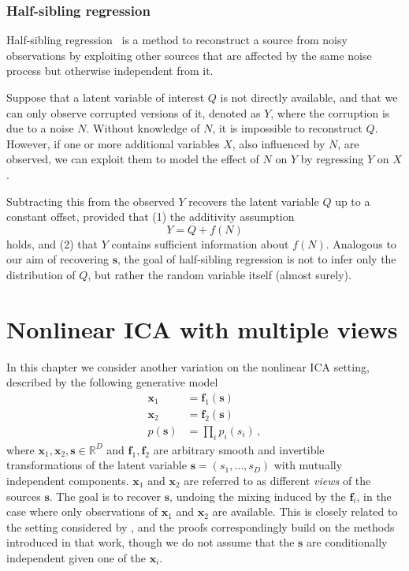 \subsubsection{Half-sibling regression}
\label{sec:hsr}
Half-sibling regression~\citep{scholkopf2016modeling} is a method to reconstruct a source from noisy observations by exploiting other sources that are affected by the same noise process but otherwise independent from it.

Suppose that a latent variable of interest $Q$ is not directly available, and that we can only observe corrupted versions of it, denoted as  $Y$, where the corruption is due to a noise $N$.
Without knowledge of $N$, it is impossible to reconstruct $Q$. However, if one or more additional variables $X$, also influenced by $N$, are observed, we can exploit them to model the effect of $N$ on $Y$ by regressing $Y$ on $X$.

Subtracting this from the observed $Y$ recovers the latent variable $Q$ up to a constant offset,
provided that (1) the additivity assumption
\[
Y = Q + f(N)
\]
holds, and (2) that $Y$ contains sufficient information about $f(N)$.
Analogous to our aim of recovering $\bm{s}$,
the goal of half-sibling regression is not to infer only the distribution of $Q$, but rather the random variable itself (almost surely).

\section{Nonlinear ICA with multiple views}\label{sec:ica-nonlinear-ica-with-mulitple-views}

In this chapter we consider another variation on the nonlinear ICA setting, described by the following generative model    
\begin{align}
\bm{x}_1 &= \bm{f}_1(\bm{s}) \label{eq:nonlinear-ica-1}\\
\bm{x}_2 &= \bm{f}_2(\bm{s}) \label{eq:nonlinear-ica-2}\\
p(\bm{s}) &= \prod_{i} p_i(s_i) \label{eq:firstind}\,,
\end{align}
where $\bm{x}_1, \bm{x}_2, \bm{s} \in \mathbb{R}^D$ and $\bm{f}_1, \bm{f}_2$ are arbitrary smooth and invertible transformations of the latent variable $\bm{s} = (s_1, \ldots, s_D)$ with mutually independent components.
$\bm{x}_1$ and $\bm{x}_2$ are referred to as different \emph{views} of the sources $\bm{s}$.
The goal is to recover $\bm{s}$, undoing the mixing induced by the $\bm{f}_i$, in the case where only observations of $\bm{x}_1$ and $\bm{x}_2$ are available.
This is closely related to the setting considered by \cite{hyvarinen19a}, and the proofs correspondingly build on the methods introduced in that work, though we do not assume that the $\bm{s}$ are conditionally independent given one of the $\bm{x}_i$.


